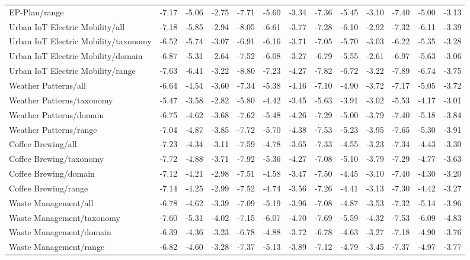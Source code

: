 \begin{tabular}{lcccccccccccc}
EP-Plan/range & -7.17 & -5.06 & -2.75 & -7.71 & -5.60 & -3.34 & -7.36 & -5.45 & -3.10 & -7.40 & -5.00 & -3.13 \\
Urban IoT Electric Mobility/all & -7.18 & -5.85 & -2.94 & -8.05 & -6.61 & -3.77 & -7.28 & -6.10 & -2.92 & -7.32 & -6.11 & -3.39 \\
Urban IoT Electric Mobility/taxonomy & -6.52 & -5.74 & -3.07 & -6.91 & -6.16 & -3.71 & -7.05 & -5.70 & -3.03 & -6.22 & -5.35 & -3.28 \\
Urban IoT Electric Mobility/domain & -6.87 & -5.31 & -2.64 & -7.52 & -6.08 & -3.27 & -6.79 & -5.55 & -2.61 & -6.97 & -5.63 & -3.06 \\
Urban IoT Electric Mobility/range & -7.63 & -6.41 & -3.22 & -8.80 & -7.23 & -4.27 & -7.82 & -6.72 & -3.22 & -7.89 & -6.74 & -3.75 \\
Weather Patterns/all & -6.64 & -4.54 & -3.60 & -7.34 & -5.38 & -4.16 & -7.10 & -4.90 & -3.72 & -7.17 & -5.05 & -3.72 \\
Weather Patterns/taxonomy & -5.47 & -3.58 & -2.82 & -5.80 & -4.42 & -3.45 & -5.63 & -3.91 & -3.02 & -5.53 & -4.17 & -3.01 \\
Weather Patterns/domain & -6.75 & -4.62 & -3.68 & -7.62 & -5.48 & -4.26 & -7.29 & -5.00 & -3.79 & -7.40 & -5.18 & -3.84 \\
Weather Patterns/range & -7.04 & -4.87 & -3.85 & -7.72 & -5.70 & -4.38 & -7.53 & -5.23 & -3.95 & -7.65 & -5.30 & -3.91 \\
Coffee Brewing/all & -7.23 & -4.34 & -3.11 & -7.59 & -4.78 & -3.65 & -7.33 & -4.55 & -3.23 & -7.34 & -4.43 & -3.30 \\
Coffee Brewing/taxonomy & -7.72 & -4.88 & -3.71 & -7.92 & -5.36 & -4.27 & -7.08 & -5.10 & -3.79 & -7.29 & -4.77 & -3.63 \\
Coffee Brewing/domain & -7.12 & -4.21 & -2.98 & -7.51 & -4.58 & -3.47 & -7.50 & -4.45 & -3.10 & -7.40 & -4.30 & -3.20 \\
Coffee Brewing/range & -7.14 & -4.25 & -2.99 & -7.52 & -4.74 & -3.56 & -7.26 & -4.41 & -3.13 & -7.30 & -4.42 & -3.27 \\
Waste Management/all & -6.78 & -4.62 & -3.39 & -7.09 & -5.19 & -3.96 & -7.08 & -4.87 & -3.53 & -7.32 & -5.14 & -3.96 \\
Waste Management/taxonomy & -7.60 & -5.31 & -4.02 & -7.15 & -6.07 & -4.70 & -7.69 & -5.59 & -4.32 & -7.53 & -6.09 & -4.83 \\
Waste Management/domain & -6.39 & -4.36 & -3.23 & -6.78 & -4.88 & -3.72 & -6.78 & -4.63 & -3.27 & -7.18 & -4.90 & -3.76 \\
Waste Management/range & -6.82 & -4.60 & -3.28 & -7.37 & -5.13 & -3.89 & -7.12 & -4.79 & -3.45 & -7.37 & -4.97 & -3.77 \\
\bottomrule
\end{tabular}

